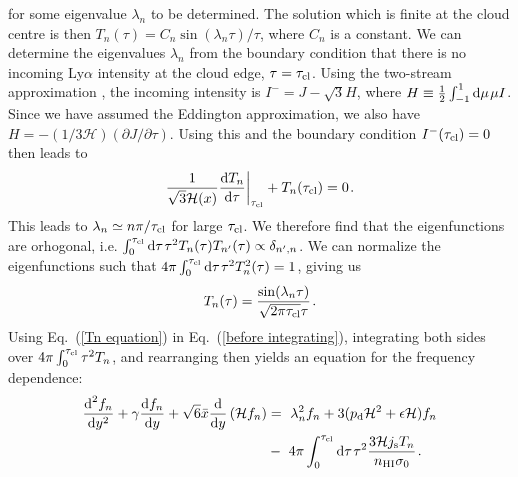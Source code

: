 \documentclass[fleqn,usenatbib]{mnras}
\newcommand{\taucl}{\tau_{\rm cl}}
\begin{document}
for some eigenvalue $\lambda_n$ to be determined. The solution which is finite at the cloud centre is then $T_n(\tau) = C_n \sin(\lambda_n \tau)/\tau$, where $C_n$ is a constant. We can determine the eigenvalues $\lambda_n$ from the boundary condition that there is no incoming Ly$\alpha$ intensity at the cloud edge, $\tau = \tau_{\rm cl}$. Using the two-stream approximation \citep[e.g.][]{Rybicki1986, Lao2020, Nebrin2023}, the incoming intensity is $I^- = J - \sqrt{3}H$, where $H \equiv \frac{1}{2} \int_{-1}^{1} \textrm{d}\mu \hspace{1 pt} \mu I$. Since we have assumed the Eddington approximation, we also have $H = - (1/3 \mathcal{H}) (\partial J/\partial\tau)$. Using this and the boundary condition $I^-(\tau_{\rm cl}) = 0$ then leads to
\begin{equation}
    \dfrac{1}{\sqrt{3} \mathcal{H}(x)} \dfrac{\textrm{d}T_n}{\textrm{d}\tau}\bigg|_{\taucl} + T_n(\tau_{\rm cl}) = 0 \hspace{1 pt} \label{BCcloudedge}.
\end{equation}
This leads to $\lambda_n \simeq n \pi /\tau_{\rm cl}$ for large $\tau_{\rm cl}$. We therefore find that the eigenfunctions are orhogonal, i.e. $\int_0^{\tau_{\rm cl}} \textrm{d}\tau \hspace{1 pt} \tau^2 T_n(\tau) T_{n'}(\tau) \propto \delta_{n',n}$. We can normalize the eigenfunctions such that $4 \pi \int_0^{\tau_{\rm cl}} \textrm{d}\tau \hspace{1 pt} \tau^2 T_n^2(\tau) = 1$, giving us
\begin{equation}
    T_n(\tau) = \dfrac{\sin(\lambda_n \tau)}{\sqrt{2 \pi \tau_{\rm cl}} \tau} \hspace{1 pt} \label{Tn sol}.
\end{equation}
Using Eq.~(\ref{Tn equation}) in Eq.~(\ref{before integrating}), integrating both sides over $4 \pi \int_0^{\tau_{\rm cl}} \tau^2 T_n$, and rearranging then yields an equation for the frequency dependence:
\begin{align}
    \dfrac{\textrm{d}^2 f_n}{\textrm{d}y^2} + \gamma \dfrac{\textrm{d} f_n}{\textrm{d}y} + \sqrt{6} \Bar{x} \dfrac{\textrm{d}}{\textrm{d}y} \left( \mathcal{H} f_n \right)  &=~ \lambda_n^2 f_n + 3 (p_{\rm d} \mathcal{H}^2 + \epsilon \mathcal{H}) f_n \nonumber \\ &-~ 4\pi \int_0^{\tau_{\rm cl}} \textrm{d}\tau \hspace{1 pt} \tau^2  \dfrac{3 \mathcal{H} j_{\rm s} T_n}{ n_{\rm HI} \sigma_0}\hspace{1 pt}. \label{freqeq1}
\end{align}
\end{document}
